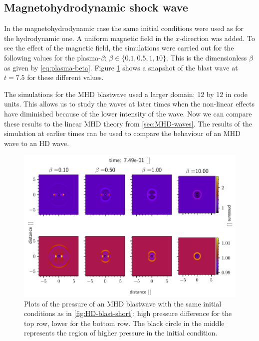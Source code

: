 \subsection{Magnetohydrodynamic shock wave}
In the magnetohydrodynamic case the same initial conditions were used as for the hydrodynamic one.
A uniform magnetic field in the $x$-direction was added. 
To see the effect of the magnetic field, the simulations were carried out for the following values for the plasma-$\beta$: $\beta \in \{0.1, 0.5,1,10\}$.
This is the dimensionless $\beta$ as given by \cref{eq:plasma-beta}.
Figure \ref{fig:MHD-blasts} shows a snapshot of the blast wave at $t=7.5$ for these different values.

The simulations for the MHD blastwave used a larger domain: 12 by 12 in code units.
This allows us to study the waves at later times when the non-linear effects have diminished because of the lower intensity of the wave.
Now we can compare these results to the linear MHD theory from \cref{sec:MHD-waves}.
The results of the simulation at earlier times can be used to compare the behaviour of an MHD wave to an HD wave.

\begin{figure}[H]
	\centering
	\includegraphics[width=\linewidth]{images/MHD-blasts.pdf}
	\caption{Plots of the pressure of an MHD blastwave with the same initial conditions as in \cref{fig:HD-blast-short}: high pressure difference for the top row, lower for the bottom row.
	The black circle in the middle represents the region of higher pressure in the initial condition.}
	\label{fig:MHD-blasts}
\end{figure}

